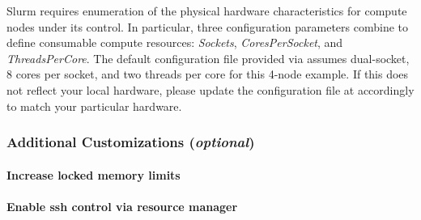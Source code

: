 \documentclass[letterpaper]{article}
\begin{document}
\begin{center}
\begin{tcolorbox}[]
  \small Slurm requires enumeration of the physical hardware characteristics
  for compute nodes under its control. In particular, three configuration
  parameters combine to define consumable compute resources: {\em Sockets},
  {\em CoresPerSocket}, and {\em ThreadsPerCore}. The default configuration
  file provided via \OHPC{} assumes dual-socket, 8 cores per socket, and two
  threads per core for this 4-node example. If this does not reflect your local
  hardware, please update the configuration file at
   accordingly to match your particular hardware.
\end{tcolorbox}
\end{center}




\subsubsection{Additional Customizations ({\em optional})} \label{sec:addl_customizations}


\paragraph{Increase locked memory limits}


\paragraph{Enable ssh control via resource manager} 

\end{document}
